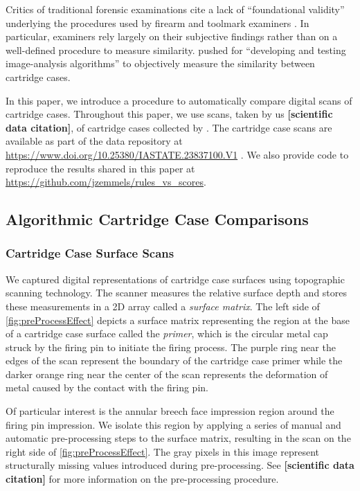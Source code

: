 \documentclass[reprint]{JASA}
\begin{document}
Critics of traditional forensic examinations cite a lack of
``foundational validity'' underlying the procedures used by firearm and
toolmark examiners \citep{council_strengthening_2009, pcast2016}. In
particular, examiners rely largely on their subjective findings rather
than on a well-defined procedure to measure similarity.
 pushed for ``developing and testing
image-analysis algorithms'' to objectively measure the similarity
between cartridge cases.

In this paper, we introduce a procedure to automatically compare digital
scans of cartridge cases. Throughout this paper, we use scans, taken by
us \textbf{{[}scientific data citation{]}}, of cartridge cases collected
by \citet{Baldwin2014}. The cartridge case scans are available as part
of the data repository at
\url{https://www.doi.org/10.25380/IASTATE.23837100.V1}
\citep{cartridgeCaseData}. We also provide code to reproduce the results
shared in this paper at
\url{https://github.com/jzemmels/rules_vs_scores}.

\hypertarget{algorithmic-cartridge-case-comparisons}{%
\subsection{Algorithmic Cartridge Case
Comparisons}\label{algorithmic-cartridge-case-comparisons}}

\hypertarget{cartridge-case-surface-scans}{%
\subsubsection{Cartridge Case Surface
Scans}\label{cartridge-case-surface-scans}}

We captured digital representations of cartridge case surfaces using
topographic scanning technology. The scanner measures the relative
surface depth and stores these measurements in a 2D array called a
\emph{surface matrix}. The left side of \autoref{fig:preProcessEffect}
depicts a surface matrix representing the region at the base of a
cartridge case surface called the \emph{primer}, which is the circular
metal cap struck by the firing pin to initiate the firing process. The
purple ring near the edges of the scan represent the boundary of the
cartridge case primer while the darker orange ring near the center of
the scan represents the deformation of metal caused by the contact with
the firing pin.

Of particular interest is the annular breech face impression region
around the firing pin impression. We isolate this region by applying a
series of manual and automatic pre-processing steps to the surface
matrix, resulting in the scan on the right side of
\autoref{fig:preProcessEffect}. The gray pixels in this image represent
structurally missing values introduced during pre-processing. See
\textbf{{[}scientific data citation{]}} for more information on the
pre-processing procedure.
\end{document}
